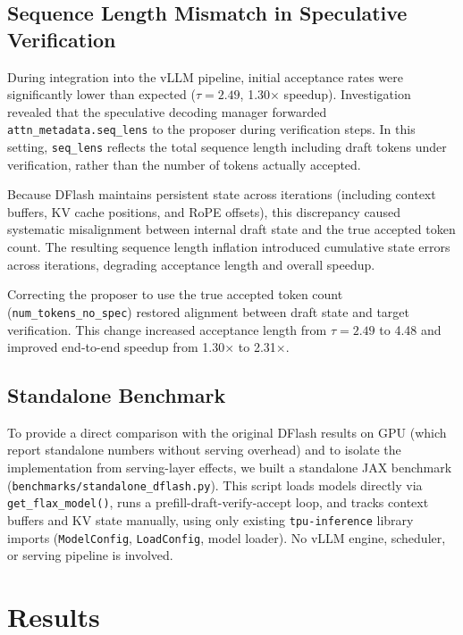 \documentclass[12pt,letterpaper]{article}
\begin{document}
\subsection{Sequence Length Mismatch in Speculative Verification}

During integration into the vLLM pipeline, initial acceptance rates were significantly lower than expected ($\tau=2.49$, 1.30$\times$ speedup). Investigation revealed that the speculative decoding manager forwarded \texttt{attn\_metadata.seq\_lens} to the proposer during verification steps. In this setting, \texttt{seq\_lens} reflects the total sequence length including draft tokens under verification, rather than the number of tokens actually accepted.

Because DFlash maintains persistent state across iterations (including context buffers, KV cache positions, and RoPE offsets), this discrepancy caused systematic misalignment between internal draft state and the true accepted token count. The resulting sequence length inflation introduced cumulative state errors across iterations, degrading acceptance length and overall speedup.

Correcting the proposer to use the true accepted token count (\texttt{num\_tokens\_no\_spec}) restored alignment between draft state and target verification. This change increased acceptance length from $\tau=2.49$ to 4.48 and improved end-to-end speedup from 1.30$\times$ to 2.31$\times$.

\subsection{Standalone Benchmark}

To provide a direct comparison with the original DFlash results on GPU (which report standalone numbers without serving overhead) and to isolate the implementation from serving-layer effects, we built a standalone JAX benchmark (\texttt{benchmarks/standalone\_dflash.py}). This script loads models directly via \texttt{get\_flax\_model()}, runs a prefill-draft-verify-accept loop, and tracks context buffers and KV state manually, using only existing \texttt{tpu-inference} library imports (\texttt{ModelConfig}, \texttt{LoadConfig}, model loader). No vLLM engine, scheduler, or serving pipeline is involved.



\section{Results}
\end{document}
